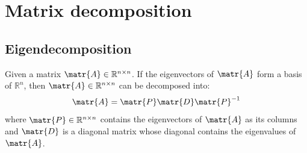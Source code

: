 \chapter{Matrix decomposition}


\section{Eigendecomposition}
Given a matrix $\matr{A} \in \mathbb{R}^{n \times n}$.
If the eigenvectors of $\matr{A}$ form a basis of $\mathbb{R}^n$,
then $\matr{A} \in \mathbb{R}^{n \times n}$ can be decomposed into:
\[ \matr{A} = \matr{P}\matr{D}\matr{P}^{-1} \]
where $\matr{P} \in \mathbb{R}^{n \times n}$ contains the eigenvectors of $\matr{A}$ as its columns and 
$\matr{D}$ is a diagonal matrix whose diagonal contains the eigenvalues of $\matr{A}$.




